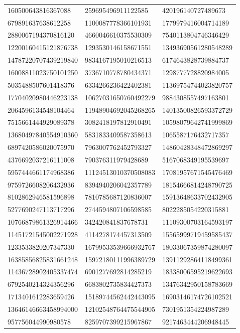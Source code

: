 \begin{longtable}{*{3}{l}}
160500643816367088&259695496911122585&420196140727489673\\
679891637638612258&1100087778366101931&1779979416004714189\\
2880067194370816120&4660046610375530309&7540113804746346429\\
12200160415121876738&1293530146158671551&13493690561280548289\\
14787220707439219840&9834167195010216513&6174643828739884737\\
16008811023750101250&3736710778780434371&1298777728820984005\\
5035488507601418376&6334266236422402381&11369754744023820757\\
17704020980446223138&10627031650760492279&9884308557497163801\\
2064596134548104464&11948904692045268265&14013500826593372729\\
7515661444929089378&3082418197812910491&10598079642741999869\\
13680497840554910360&5831833409587358613&1065587176432717357\\
6897420586020075970&7963007762452793327&14860428348472869297\\
4376692037216111008&790376311979428689&5167068349195539697\\
5957444661174968386&11124513010370508083&17081957671545476469\\
9759726608206432936&8394940206042357789&18154666814248790725\\
8102862946581596898&7810785687120836007&15913648633702432905\\
5277690247113717296&2744594807106598585&8022285054220315881\\
10766879861326914466&342420841837678731&11109300703164593197\\
11451721545002271928&4114278174457313509&15565999719459585437\\
1233533820207347330&16799533539666932767&18033067359874280097\\
16385856825831661248&15972180111996389729&13911292864118499361\\
11436728902405337474&6901277692814285219&18338006595219622693\\
6792540214324356296&6683802735834427373&13476342950158783669\\
1713401612283659426&15189744562442443095&16903146174726102521\\
13646146663458994000&12102548764475544905&7301951354224987289\\
957756044990980578&8259707399215967867&9217463444206948445\\

\end{longtable}
